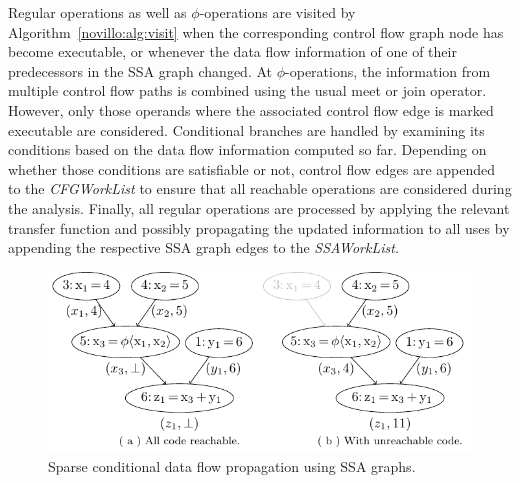 Regular operations as well as $\phi$-operations are visited by
Algorithm~\ref{novillo:alg:visit} when the corresponding control flow graph node
has become executable, or whenever the data flow information of one of their
predecessors in the SSA graph changed. At \linebreak $\phi$-operations, the
information
from multiple control flow paths is combined using the usual meet or join
operator. However, only those operands where the associated control flow edge is
marked executable are considered. Conditional
branches are handled by examining its conditions based on the data flow
information computed so far. Depending on whether those conditions are
satisfiable or not, control flow edges are appended to the \emph{CFGWorkList} 
to ensure that all reachable operations are considered during the analysis.
Finally, all regular operations are processed by applying the relevant transfer
function and possibly propagating the updated information to all uses by
appending the respective SSA graph edges to the \emph{SSAWorkList}.

\begin{figure}[t]
  \includegraphics{ssa_propagation}
  \subfloat{\label{fig:constant_propagation_is_easier:ssa_propagation:a}}
  \subfloat{\label{fig:constant_propagation_is_easier:ssa_propagation:b}}
  \caption{Sparse conditional data flow propagation using SSA graphs.}
  \label{fig:constant_propagation_is_easier:ssa_propagation}
\end{figure}

